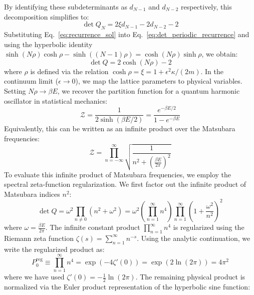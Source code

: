 By identifying these subdeterminants as $d_{N-1}$ and $d_{N-2}$ respectively, this decomposition simplifies to:
\begin{equation}
\det Q_N = 2\xi d_{N-1} - 2 d_{N-2} - 2
\label{eq:det_periodic_recurrence}
\end{equation}
Substituting Eq.~\eqref{eq:recurrence_sol} into Eq.~\eqref{eq:det_periodic_recurrence} and using the hyperbolic identity $\sinh(N\rho)\cosh\rho - \sinh((N-1)\rho) = \cosh(N\rho)\sinh\rho$, we obtain:
\begin{equation}
\det Q = 2 \cosh(N \rho) - 2
\label{eq:det_Q}
\end{equation}
where $\rho$ is defined via the relation $\cosh \rho = \xi = 1 + \epsilon^2 \kappa / (2m)$. In the continuum limit ($\epsilon \to 0$), we map the lattice parameters to physical variables. Setting $N\rho \to \beta E$, we recover the partition function for a quantum harmonic oscillator in statistical mechanics:
\begin{equation}
\mathcal{Z} = \frac{1}{2\sinh(\beta E / 2)} = \frac{e^{-\beta E/2}}{1 - e^{-\beta E}}
\label{eq:ho_partition_limit}
\end{equation}
Equivalently, this can be written as an infinite product over the Matsubara frequencies:
\begin{equation}
\mathcal{Z} = \prod_{n=-\infty}^{\infty} \sqrt{\frac{1}{n^2 + \left(\frac{\beta E}{2\pi}\right)^2}}
\label{eq:ho_matsubara}
\end{equation}
To evaluate this infinite product of Matsubara frequencies, we employ the spectral zeta-function regularization. We first factor out the infinite product of Matsubara indices $n^2$:
\begin{equation}
\det Q = \omega^2 \prod_{n \neq 0} \left( n^2 + \omega^2 \right) = \omega^2 \left( \prod_{n=1}^\infty n^4 \right) \prod_{n=1}^\infty \left( 1 + \frac{\omega^2}{n^2} \right)^2
\label{eq:det_Q_factored}
\end{equation}
where $\omega = \frac{\beta E}{2\pi}$. The infinite constant product $\prod_{n=1}^\infty n^4$ is regularized using the Riemann zeta function $\zeta(s) = \sum_{n=1}^\infty n^{-s}$. Using the analytic continuation, we write the regularized product as:
\begin{equation}
P_0^{\mathrm{reg}} \equiv \prod_{n=1}^\infty n^4 = \exp\left( -4\zeta'(0) \right) = \exp\left( 2\ln(2\pi) \right) = 4\pi^2
\label{eq:zeta_const_reg}
\end{equation}
where we have used $\zeta'(0) = -\frac{1}{2}\ln(2\pi)$. The remaining physical product is normalized via the Euler product representation of the hyperbolic sine function:
